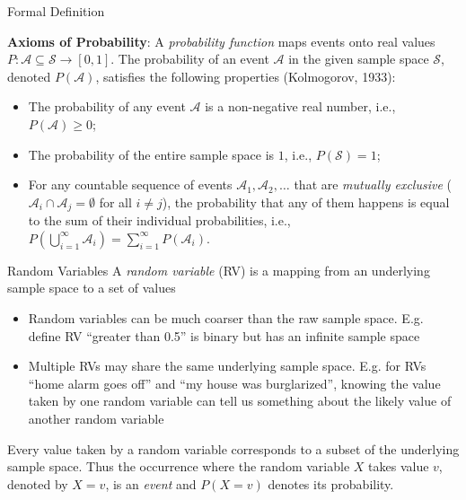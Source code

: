 {\begin{frame}{Formal Definition}
        \begin{boxed}
            \textbf{Axioms of Probability}:
            A \emph{probability function} maps events onto real values
            ${P: \mathcal{A} \subseteq \mathcal{S} \rightarrow [0,1]}$.
            The probability of an event $\mathcal{A}$ in the given sample space $\mathcal{S}$, denoted $P(\mathcal{A})$,
            satisfies the following properties (Kolmogorov, 1933):

            \begin{itemize}
                \item The probability of any event $\mathcal{A}$ is a non-negative real number, i.e., $P(\mathcal{A}) \geq 0$;
                \item The probability of the entire sample space is $1$, i.e., $P(\mathcal{S}) = 1$;
                \item For any countable sequence of events $\mathcal{A}_1, \mathcal{A}_2, \ldots$ that are \emph{mutually exclusive} ($\mathcal{A}_i \cap \mathcal{A}_j = \emptyset$ for all $i \neq j$), the probability that any of them happens is equal to the sum of their individual probabilities, i.e., $P(\bigcup_{i=1}^{\infty} \mathcal{A}_i) = \sum_{i=1}^{\infty} P(\mathcal{A}_i)$.
            \end{itemize}
        \end{boxed}
    \end{frame}



    \begin{frame}{Random Variables}
        A \emph{random variable} (RV) is a mapping from an underlying sample space to a set of values
        \begin{itemize}
            \item Random variables can be much coarser than the raw sample space. E.g. define RV
                  ``greater than 0.5'' is binary but has an infinite sample space
            \item Multiple RVs may share the same underlying sample space. E.g. for RVs ``home alarm goes off''
                  and ``my house was burglarized'', knowing the value taken by one random variable can tell us
                  something about the likely value of another random variable
        \end{itemize}

        Every value taken by a random variable corresponds
        to a subset of the underlying sample space.
        Thus the occurrence where the random variable $X$
        takes value $v$, denoted by $X=v$, is an \emph{event}
        and $P(X=v)$ denotes its probability.
    \end{frame}

}
